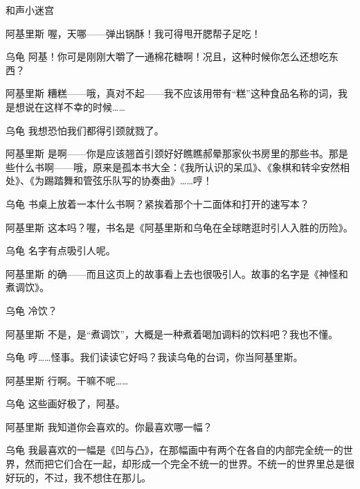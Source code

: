 \begin{dialog}{和声小迷宫}
\begin{dialogue}
\item[阿基里斯]喔，天哪——弹出锅酥！我可得甩开腮帮子足吃！

\item[乌龟]阿基！你可是刚刚大嚼了一通棉花糖啊！况且，这种时候你怎么还想吃东西？

\item[阿基里斯]糟糕——哦，真对不起——我不应该用带有“糕”这种食品名称的词，我是想说在这样不幸的时候……

\item[乌龟]我想恐怕我们都得引颈就戮了。

\item[阿基里斯]是啊——你是应该翘首引颈好好瞧瞧郝晕那家伙书房里的那些书。那是些什么书啊——哦，原来是孤本书大全：《我所认识的呆瓜》、《象棋和转伞安然相处》、《为踢踏舞和管弦乐队写的协奏曲》……哼！

\item[乌龟]书桌上放着一本什么书啊？紧挨着那个十二面体和打开的速写本？

\item[阿基里斯]这本吗？喔，书名是《阿基里斯和乌龟在全球瞎逛时引人入胜的历险》。

\item[乌龟]名字有点吸引人呢。

\item[阿基里斯]的确——而且这页上的故事看上去也很吸引人。故事的名字是《神怪和煮调饮》。

\item[乌龟]冷饮？

\item[阿基里斯]不是，是“煮调饮”，大概是一种煮着喝加调料的饮料吧？我也不懂。

\item[乌龟]哼……怪事。我们读读它好吗？我读乌龟的台词，你当阿基里斯。

\item[阿基里斯]行啊。干嘛不呢……


  \begin{dialogue}

  \item[]

  \item[乌龟]这些画好极了，阿基。

  \item[阿基里斯]我知道你会喜欢的。你最喜欢哪一幅？

  \item[乌龟]我最喜欢的一幅是《凹与凸》，在那幅画中有两个在各自的内部完全统一的世界，然而把它们合在一起，却形成一个完全不统一的世界。不统一的世界里总是很好玩的，不过，我不想住在那儿。


\end{dialogue}
\end{dialogue}
\end{dialog}
